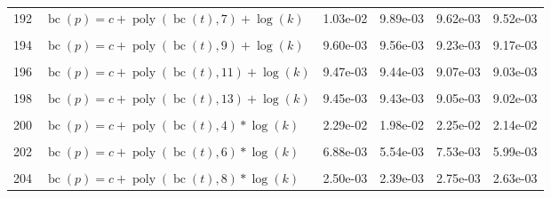 \documentclass[12pt,a4paper]{article}
\DeclareMathOperator{\bc}{bc}
\DeclareMathOperator{\poly}{poly}
\begin{document}
\begin{longtable}[t]{ll>{\raggedleft\arraybackslash}p{2cm}>{\raggedleft\arraybackslash}p{2cm}>{\raggedleft\arraybackslash}p{2cm}>{\raggedleft\arraybackslash}p{2cm}}
192 & $\bc(p) = c + \poly\left( \bc(t), 7 \right) + \log(k)$ & 1.03e-02 & 9.89e-03 & 9.62e-03 & 9.52e-03\\
\cellcolor{gray!6}{193} & \cellcolor{gray!6}{$\bc(p) = c + \poly\left( \bc(t), 8 \right) + \log(k)$} & \cellcolor{gray!6}{9.63e-03} & \cellcolor{gray!6}{9.58e-03} & \cellcolor{gray!6}{9.27e-03} & \cellcolor{gray!6}{9.20e-03}\\
194 & $\bc(p) = c + \poly\left( \bc(t), 9 \right) + \log(k)$ & 9.60e-03 & 9.56e-03 & 9.23e-03 & 9.17e-03\\
\cellcolor{gray!6}{195} & \cellcolor{gray!6}{$\bc(p) = c + \poly\left( \bc(t), 10 \right) + \log(k)$} & \cellcolor{gray!6}{9.47e-03} & \cellcolor{gray!6}{9.44e-03} & \cellcolor{gray!6}{9.07e-03} & \cellcolor{gray!6}{9.03e-03}\\
196 & $\bc(p) = c + \poly\left( \bc(t), 11 \right) + \log(k)$ & 9.47e-03 & 9.44e-03 & 9.07e-03 & 9.03e-03\\
\cellcolor{gray!6}{197} & \cellcolor{gray!6}{$\bc(p) = c + \poly\left( \bc(t), 12 \right) + \log(k)$} & \cellcolor{gray!6}{9.46e-03} & \cellcolor{gray!6}{9.43e-03} & \cellcolor{gray!6}{9.05e-03} & \cellcolor{gray!6}{9.02e-03}\\
198 & $\bc(p) = c + \poly\left( \bc(t), 13 \right) + \log(k)$ & 9.45e-03 & 9.43e-03 & 9.05e-03 & 9.02e-03\\
\cellcolor{gray!6}{199} & \cellcolor{gray!6}{$\bc(p) = c + \poly\left( \bc(t), 3 \right) * \log(k)$} & \cellcolor{gray!6}{3.52e-02} & \cellcolor{gray!6}{1.67e-02} & \cellcolor{gray!6}{1.89e-02} & \cellcolor{gray!6}{1.78e-02}\\
200 & $\bc(p) = c + \poly\left( \bc(t), 4 \right) * \log(k)$ & 2.29e-02 & 1.98e-02 & 2.25e-02 & 2.14e-02\\
\cellcolor{gray!6}{201} & \cellcolor{gray!6}{$\bc(p) = c + \poly\left( \bc(t), 5 \right) * \log(k)$} & \cellcolor{gray!6}{7.62e-03} & \cellcolor{gray!6}{7.61e-03} & \cellcolor{gray!6}{7.61e-03} & \cellcolor{gray!6}{7.59e-03}\\
202 & $\bc(p) = c + \poly\left( \bc(t), 6 \right) * \log(k)$ & 6.88e-03 & 5.54e-03 & 7.53e-03 & 5.99e-03\\
\cellcolor{gray!6}{203} & \cellcolor{gray!6}{$\bc(p) = c + \poly\left( \bc(t), 7 \right) * \log(k)$} & \cellcolor{gray!6}{3.86e-03} & \cellcolor{gray!6}{3.22e-03} & \cellcolor{gray!6}{3.60e-03} & \cellcolor{gray!6}{3.39e-03}\\
204 & $\bc(p) = c + \poly\left( \bc(t), 8 \right) * \log(k)$ & 2.50e-03 & 2.39e-03 & 2.75e-03 & 2.63e-03\\

\end{longtable}
\end{document}
